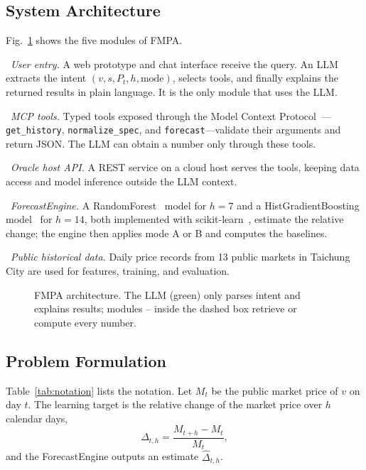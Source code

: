 \subsection{System Architecture}
Fig.~\ref{fig:architecture} shows the five modules of FMPA.

~\textit{User entry.} A web prototype and chat interface receive the
query. An LLM extracts the intent $(v, s, P_t, h, \text{mode})$, selects tools,
and finally explains the returned results in plain language. It is the only
module that uses the LLM.

~\textit{MCP tools.} Typed tools exposed through the Model Context
Protocol~\cite{anthropic2024mcp}---\texttt{get\_history},
\texttt{normalize\_spec}, and \texttt{forecast}---validate their arguments and
return JSON. The LLM can obtain a number only through these tools.

~\textit{Oracle host API.} A REST service on a cloud host serves the
tools, keeping data access and model inference outside the LLM context.

~\textit{ForecastEngine.} A RandomForest~\cite{breiman2001random}
model for $h=7$ and a HistGradientBoosting model~\cite{ke2017lightgbm} for
$h=14$, both implemented with scikit-learn~\cite{pedregosa2011scikit},
estimate the relative change; the engine then applies mode A or B and computes
the baselines.

~\textit{Public historical data.} Daily price records from 13 public
markets in Taichung City are used for features, training, and evaluation.

\begin{figure}[t]
\centering

\caption{FMPA architecture. The LLM (green) only parses intent and explains
results; modules -- inside the dashed box retrieve or compute
every number.}
\label{fig:architecture}
\end{figure}

\subsection{Problem Formulation}
Table~\ref{tab:notation} lists the notation. Let $M_t$ be the public market
price of $v$ on day $t$. The learning target is the relative change of the
market price over $h$ calendar days,
\begin{equation}
\Delta_{t,h}=\frac{M_{t+h}-M_t}{M_t},
\label{eq:delta}
\end{equation}
and the ForecastEngine outputs an estimate $\hat{\Delta}_{t,h}$.

